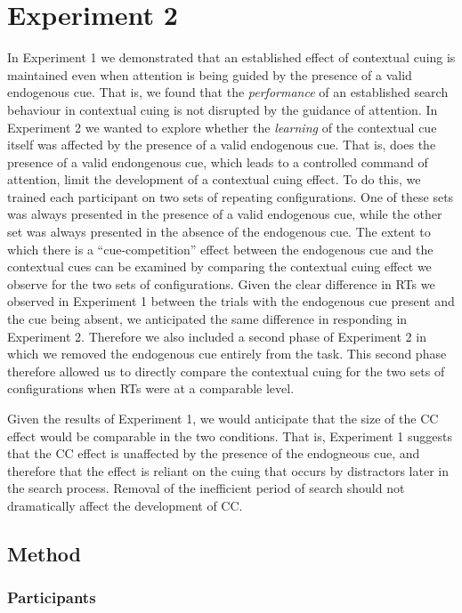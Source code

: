 \documentclass[
  man,
  floatsintext,
  longtable,
  nolmodern,
  notxfonts,
  notimes,
  colorlinks=true,linkcolor=blue,citecolor=blue,urlcolor=blue]{apa7}
\begin{document}
\section{Experiment 2}\label{experiment-2}

In Experiment 1 we demonstrated that an established effect of contextual
cuing is maintained even when attention is being guided by the presence
of a valid endogenous cue. That is, we found that the \emph{performance}
of an established search behaviour in contextual cuing is not disrupted
by the guidance of attention. In Experiment 2 we wanted to explore
whether the \emph{learning} of the contextual cue itself was affected by
the presence of a valid endogenous cue. That is, does the presence of a
valid endongenous cue, which leads to a controlled command of attention,
limit the development of a contextual cuing effect. To do this, we
trained each participant on two sets of repeating configurations. One of
these sets was always presented in the presence of a valid endogenous
cue, while the other set was always presented in the absence of the
endogenous cue. The extent to which there is a ``cue-competition''
effect between the endogenous cue and the contextual cues can be
examined by comparing the contextual cuing effect we observe for the two
sets of configurations. Given the clear difference in RTs we observed in
Experiment 1 between the trials with the endogenous cue present and the
cue being absent, we anticipated the same difference in responding in
Experiment 2. Therefore we also included a second phase of Experiment 2
in which we removed the endogenous cue entirely from the task. This
second phase therefore allowed us to directly compare the contextual
cuing for the two sets of configurations when RTs were at a comparable
level.

Given the results of Experiment 1, we would anticipate that the size of
the CC effect would be comparable in the two conditions. That is,
Experiment 1 suggests that the CC effect is unaffected by the presence
of the endogneous cue, and therefore that the effect is reliant on the
cuing that occurs by distractors later in the search process. Removal of
the inefficient period of search should not dramatically affect the
development of CC.

\subsection{Method}\label{method-1}

\subsubsection{Participants}\label{participants-1}
\end{document}
